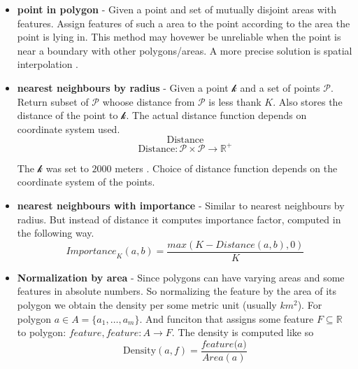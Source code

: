 \begin{itemize}
    \item[] \textbf{point in polygon} - Given a point and set of mutually disjoint areas with features. Assign features of such a area to the point according to the area the point is lying in. This method may hovewer be unreliable when the point is near a boundary with other polygons/areas. A more precise solution is spatial interpolation .
    \item[] \textbf{nearest neighbours by radius} - Given a point $\mathcal{k}$ and a set of points $\mathcal{P}$. Return subset of $\mathcal{P}$  whoose distance from $\mathcal{P}$ is less thank $K$. Also stores the distance of the point to $\mathcal{k}$. The actual distance function depends on coordinate system used.
          \[ \text{Distance}  \]
          \[\text{Distance}: \mathcal{P} \times \mathcal{P} \rightarrow \mathbb{R}^+  \]

          The $\mathcal{k}$ was set to $2000$ meters . Choice of distance function depends on the coordinate system of the points.
    \item[] \textbf{nearest neighbours with importance} - Similar to nearest neighbours by radius. But instead of distance it computes importance factor, computed in the following way.
          \[
              \textit{Importance}_K(a,b) = \frac{max( K - \textit{Distance}(a,b) ,0)}{K}
          \]


    \item[] \textbf{Normalization by area} - Since polygons can have varying areas and some features in absolute numbers. So normalizing the feature by the area of its polygon we obtain the density per some metric unit (usually $km^2$). For polygon $a \in A = \{a_1, \dots , a_m\}$. And funciton that assigns some feature $F \subseteq \mathbb{R}$  to polygon: $\textit{feature}, \textit{feature}: A \rightarrow F$. The density is computed like so
          \[ \text{Density}(a,f) = \frac{\textit{feature(a)}}{\textit{Area}(a)} \]
          \[\]

\end{itemize}
